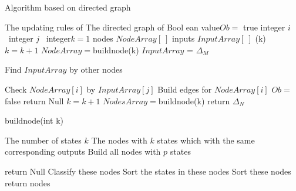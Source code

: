 \begin{algorithm}[h]
\caption{Algorithm based on directed graph}
\begin{algorithmic}[1]
\REQUIRE 
The updating rules of \BCN
\ENSURE  
The directed graph of \BCN
\STATE Bool ean value$Ob=$ true 
\STATE integer $i$ \
\STATE integer $j$ \
\STATE integer$k=1$ 
\STATE nodes $NodeArray[\ ]$
\STATE inputs $InputArray[\ ]$
(k)
\STATE $k= k+1$
\STATE $NodeArray=${\sf buildnode}(k)
\IF{($k==2$)}
\STATE $InputArray$ = $\Delta_M$ 
\ELSE

\STATE Find $InputArray$ by other nodes

\ENDIF
{}
\STATE Check $NodeArray[i]$ by $InputArray[j]$ 
\STATE Build edges for $NodeArray[i]$ 
\ENDFOR
{}
\STATE  $Ob=$ false 
\STATE return Null
\ENDIF
\ENDFOR
\STATE $k= k+1$
\STATE $NodesArray=${\sf buildnode}(k)
\ENDWHILE
\STATE return $\Delta_N$\
\end{algorithmic}
 \label{alg:1}
\end{algorithm}
\begin{algorithm}[h!]
\caption{{\sf buildnode}(int k)}
\begin{algorithmic}[1]
\REQUIRE 
The number of states $k$
\ENSURE  
The nodes with $k$ states which with the same corresponding outputs 
\STATE  Build all nodes with $p$ states 

\IF{(Failed to build)} 
\STATE  return Null
\ELSE 
\STATE  Classify these nodes
\STATE Sort the states in these nodes
\STATE Sort these nodes
\STATE return nodes
\ENDIF 
\end{algorithmic}
 \label{alg:2}
\end{algorithm}

